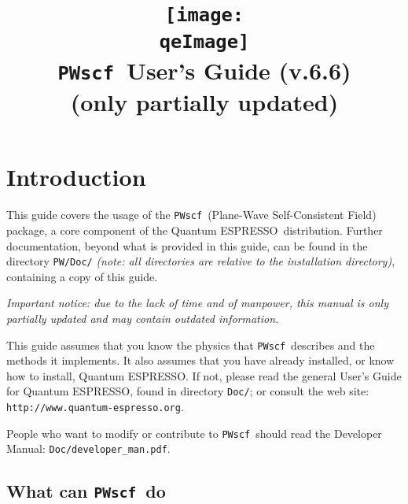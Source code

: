 \documentclass[12pt,a4paper]{article}
\def\version{6.6}
\def\PWscf{\texttt{PWscf}}
\def\qe{{\sc Quantum ESPRESSO}}
\begin{document}
 
\author{}
\date{}

\def\qeImage{../../Doc/quantum_espresso.pdf}

\title{
  \texttt{[image: \\qeImage]} \\
  \Huge \PWscf\ User's Guide (v.\version) 
  \\ \Large (only partially updated)
}

\maketitle

\tableofcontents

\section{Introduction}

This guide covers the usage of the \PWscf\ 
(Plane-Wave Self-Consistent Field) package,
a core component of the \qe\ distribution.
Further documentation, beyond what is provided 
in this guide, can be found in the directory
\texttt{PW/Doc/}
{\em (note: all directories are relative to the installation
directory)}, containing a copy of this guide.

{\em Important notice: due to the lack of time and of manpower, this
manual is only partially updated and may contain outdated information.}

This guide assumes that you know the physics 
that \PWscf\ describes and the methods it implements.
It also assumes  that you have already installed,
or know how to install, \qe. If not, please read
the general User's Guide for \qe, found in 
directory \texttt{Doc/}; or consult the web site:\\
\texttt{http://www.quantum-espresso.org}.

People who want to modify or contribute to 
\PWscf\ should read the Developer Manual: 
\texttt{Doc/developer\_man.pdf}.

\subsection{What can \PWscf\ do}
\end{document}
